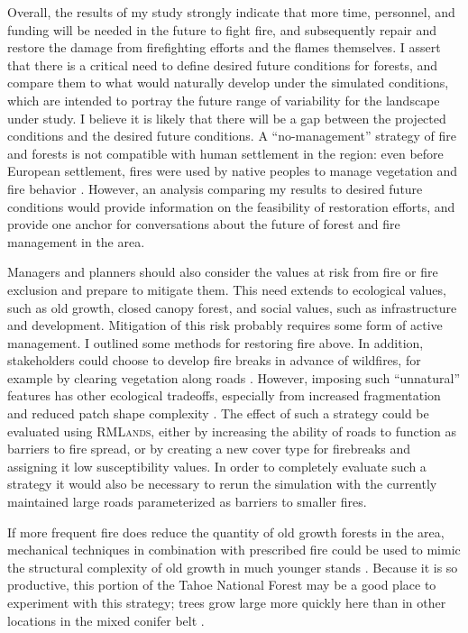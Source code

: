 Overall, the results of my study strongly indicate that more time, personnel, and funding will be needed in the future to fight fire, and subsequently repair and restore the damage from firefighting efforts and the flames themselves. I assert that there is a critical need to define desired future conditions for forests, and compare them to what would naturally develop under the simulated conditions, which are intended to portray the future range of variability for the landscape under study. I believe it is likely that there will be a gap between the projected conditions and the desired future conditions. A ``no-management'' strategy of fire and forests is not compatible with human settlement in the region: even before European settlement, fires were used by native peoples to manage vegetation and fire behavior \citep{Anderson1996}. However, an analysis comparing my results to desired future conditions would provide information on the feasibility of restoration efforts, and provide one anchor for conversations about the future of forest and fire management in the area.



Managers and planners should also consider the values at risk from fire or fire exclusion and prepare to mitigate them. This need extends to ecological values, such as old growth, closed canopy forest, and social values, such as infrastructure and development. Mitigation of this risk probably requires some form of active management. I outlined some methods for restoring fire above. In addition, stakeholders could choose to develop fire breaks in advance of wildfires, for example by clearing vegetation along roads \citep{Conard2003}. However, imposing such ``unnatural'' features has other ecological tradeoffs, especially from increased fragmentation and reduced patch shape complexity \citep{Trombulak2000}. The effect of such a strategy could be evaluated using \textsc{RMLands}, either by increasing the ability of roads to function as barriers to fire spread, or by creating a new cover type for firebreaks and assigning it low susceptibility values. In order to completely evaluate such a strategy it would also be necessary to rerun the simulation with the currently maintained large roads parameterized as barriers to smaller fires.

If more frequent fire does reduce the quantity of old growth forests in the area, mechanical techniques in combination with prescribed fire could be used to mimic the structural complexity of old growth in much younger stands \citep{Franklin2002}. Because it is so productive, this portion of the Tahoe National Forest may be a good place to experiment with this strategy; trees grow large more quickly here than in other locations in the mixed conifer belt \citep{PRISMClimateGroup2004,Littell2012}.

